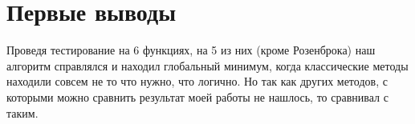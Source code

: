 \documentclass{article}
\begin{document}
    \section{Первые выводы}
    Проведя тестирование на 6 функциях, на 5 из них (кроме Розенброка) наш алгоритм справлялся и находил глобальный минимум, когда классические методы находили совсем не то что нужно, что логично. Но так как других методов, с которыми можно сравнить результат моей работы не нашлось, то сравнивал с таким.
\end{document}
